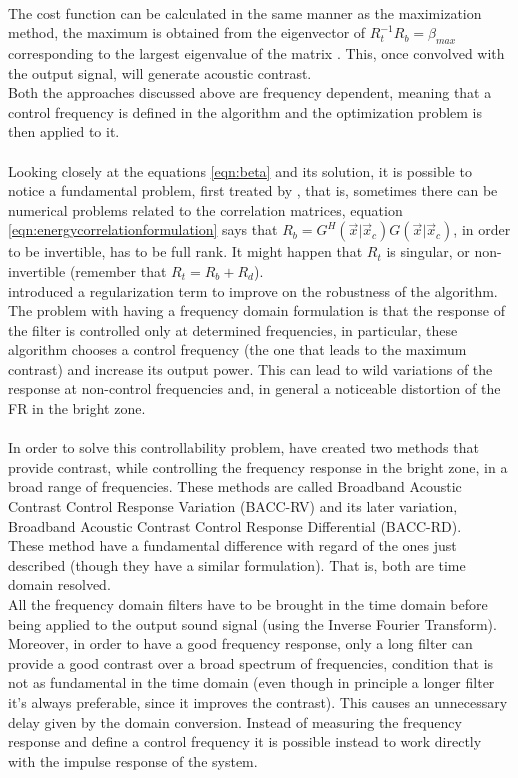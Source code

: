 \\
The cost function can be calculated in the same manner
as the maximization method, the maximum is obtained from the eigenvector of $R_t^{-1} R_b = \beta_{max}$ corresponding to the largest eigenvalue of the matrix \parencite{choi_generation_2002,schellekens_time_2016}. This, once convolved with the output signal, will generate acoustic contrast.
\\
Both the approaches discussed above are frequency dependent, meaning that a control frequency is defined in the algorithm and the optimization problem is then applied to it.
\\
\\
Looking closely at the equations \ref{eqn:beta} and its solution, it is possible to notice a fundamental problem, first treated by \parencite{elliott_robustness_2012}, that is, sometimes there can be numerical problems related to the correlation matrices, equation \ref{eqn:energycorrelationformulation} says that $R_b =\textit{G}^H(\vec{x}|\vec{x}_c)\textit{G}(\vec{x}|\vec{x}_c)$, in order to be invertible, has to be full rank. It might happen that $R_t$ is singular, or non-invertible (remember that $ R_t = R_b + R_d$).
\\
\parencite{elliott_robustness_2012} introduced a regularization term to improve on the robustness of the algorithm. The problem with having a frequency domain formulation is that the response of the filter is controlled only at determined frequencies, in particular, these algorithm chooses a control frequency (the one that leads to the maximum contrast) and increase its output power. This can lead to wild variations of the response at non-control frequencies and, in general a noticeable distortion of the FR in the bright zone.
\\
\\
In order to solve this controllability problem, \parencite{cai_time-domain_2014} have created two methods that provide contrast, while controlling the frequency response in the bright zone, in a broad range of frequencies. These methods are called Broadband Acoustic Contrast Control Response Variation (BACC-RV) and its later variation, Broadband Acoustic Contrast Control Response Differential (BACC-RD).
\\
These method have a fundamental difference with regard of the ones just described (though they have a similar formulation). That is, both are time domain resolved.
\\
All the frequency domain filters have to be brought in the time domain before being applied to the output sound signal (using the Inverse Fourier Transform). Moreover, in order to have a good frequency response, only a long filter can provide a good contrast over a broad spectrum of frequencies, condition that is not as fundamental in the time domain (even though in principle a longer filter it's always preferable, since it improves the contrast). This causes an unnecessary delay given by the domain conversion. Instead of measuring the frequency response and define a control frequency it is possible instead to work directly with the impulse response of the system.
